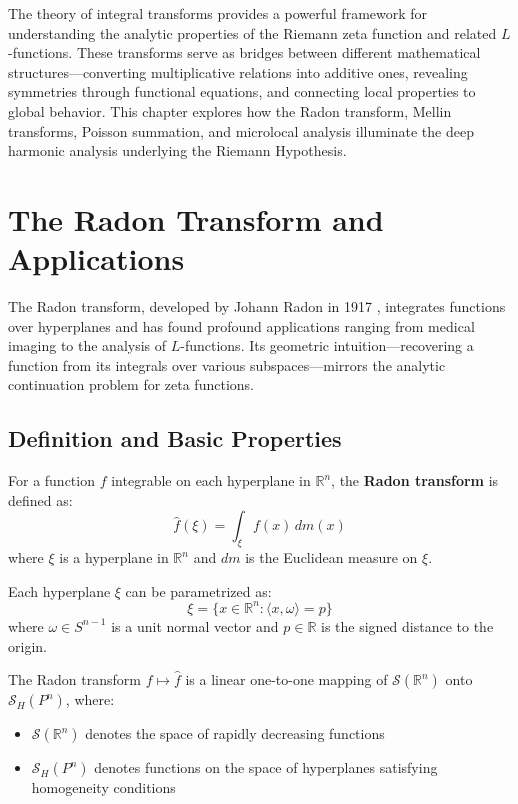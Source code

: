 \label{ch:integral-transforms}

The theory of integral transforms provides a powerful framework for understanding the analytic properties of the Riemann zeta function and related $L$-functions. These transforms serve as bridges between different mathematical structures—converting multiplicative relations into additive ones, revealing symmetries through functional equations, and connecting local properties to global behavior. This chapter explores how the Radon transform, Mellin transforms, Poisson summation, and microlocal analysis illuminate the deep harmonic analysis underlying the Riemann Hypothesis.

\section{The Radon Transform and Applications}
\label{sec:radon-transform}

The Radon transform, developed by Johann Radon in 1917 \cite{helgason1999}, integrates functions over hyperplanes and has found profound applications ranging from medical imaging to the analysis of $L$-functions. Its geometric intuition—recovering a function from its integrals over various subspaces—mirrors the analytic continuation problem for zeta functions.

\subsection{Definition and Basic Properties}

\begin{definition}
For a function $f$ integrable on each hyperplane in $\mathbb{R}^n$, the \textbf{Radon transform} is defined as:
$$\hat{f}(\xi) = \int_{\xi} f(x) \, dm(x)$$
where $\xi$ is a hyperplane in $\mathbb{R}^n$ and $dm$ is the Euclidean measure on $\xi$.
\end{definition}

Each hyperplane $\xi$ can be parametrized as:
$$\xi = \{x \in \mathbb{R}^n : \langle x, \omega \rangle = p\}$$
where $\omega \in S^{n-1}$ is a unit normal vector and $p \in \mathbb{R}$ is the signed distance to the origin.

\begin{theorem}
The Radon transform $f \mapsto \hat{f}$ is a linear one-to-one mapping of $\mathcal{S}(\mathbb{R}^n)$ onto $\mathcal{S}_H(P^n)$, where:
\begin{itemize}
\item $\mathcal{S}(\mathbb{R}^n)$ denotes the space of rapidly decreasing functions
\item $\mathcal{S}_H(P^n)$ denotes functions on the space of hyperplanes satisfying homogeneity conditions
\end{itemize}
\end{theorem}

